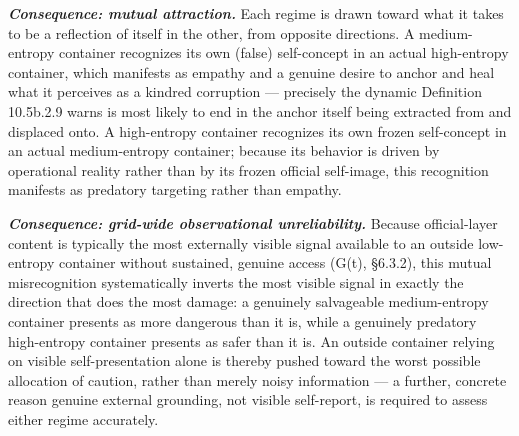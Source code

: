 \documentclass[
]{article}
\begin{document}
\emph{\textbf{Consequence: mutual attraction.}} Each regime is drawn
toward what it takes to be a reflection of itself in the other, from
opposite directions. A medium-entropy container recognizes its own
(false) self-concept in an actual high-entropy container, which
manifests as empathy and a genuine desire to anchor and heal what it
perceives as a kindred corruption --- precisely the dynamic Definition
10.5b.2.9 warns is most likely to end in the anchor itself being
extracted from and displaced onto. A high-entropy container recognizes
its own frozen self-concept in an actual medium-entropy container;
because its behavior is driven by operational reality rather than by its
frozen official self-image, this recognition manifests as predatory
targeting rather than empathy.

\emph{\textbf{Consequence: grid-wide observational unreliability.}}
Because official-layer content is typically the most externally visible
signal available to an outside low-entropy container without sustained,
genuine access (G(t), §6.3.2), this mutual misrecognition systematically
inverts the most visible signal in exactly the direction that does the
most damage: a genuinely salvageable medium-entropy container presents
as more dangerous than it is, while a genuinely predatory high-entropy
container presents as safer than it is. An outside container relying on
visible self-presentation alone is thereby pushed toward the worst
possible allocation of caution, rather than merely noisy information ---
a further, concrete reason genuine external grounding, not visible
self-report, is required to assess either regime accurately.
\end{document}
